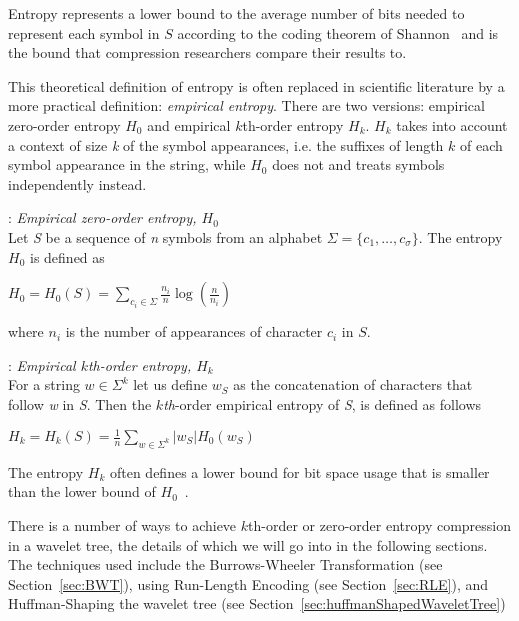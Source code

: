Entropy represents a lower bound to the average number of bits needed to represent each symbol in $S$ according to the coding theorem of Shannon~ and is the bound that compression researchers compare their results to.

This theoretical definition of entropy is often replaced in scientific literature by a more practical definition: \textit{empirical entropy}.
There are two versions: empirical zero-order entropy $H_0$ and empirical $k$th-order entropy $H_k$. $H_k$ takes into account a context of size \textit{k} of the symbol appearances, i.e. the suffixes of length $k$ of each symbol appearance in the string, while $H_0$ does not and treats symbols independently instead. 

\begin{mdframed}[nobreak, linecolor=lightgray, linewidth=2pt]
\begin{definition}: \emph{Empirical zero-order entropy, $H_0$} \\
Let \textit{S} be a sequence of \textit{n} symbols from an alphabet $\Sigma = \lbrace c_1, \ldots, c_\sigma \rbrace$.
The entropy $H_0$ is defined as
\begin{center}
$H_0 = H_0(S) = \sum\limits_{c_i \in \Sigma} \frac{n_i}{n} \log(\frac{n}{n_i})$
\end{center}
where $n_i$ is the number of appearances of character $c_i$ in $S$.
\end{definition}
\begin{definition}: \emph{Empirical $k$\emph{th}-order entropy, $H_k$} \\
For a string $w \in \Sigma^k$ let us define $w_S$ as the concatenation of characters that follow \textit{w} in \textit{S}. 
Then the $k$\emph{th}-order empirical entropy of \textit{S}, is defined as follows
\begin{center}
$H_k = H_k(S) = \frac{1}{n} \sum\limits_{w \in \Sigma^k} | w_S |H_0(w_S)$
\end{center}
\end{definition}
\end{mdframed}
The entropy $H_k$ often defines a lower bound for bit space usage that is smaller than the lower bound of $H_0$~.

There is a number of ways to achieve $k$th-order or zero-order entropy compression in a wavelet tree, the details of which we will go into in the following sections.
The techniques used include the Burrows-Wheeler Transformation (see Section~\ref{sec:BWT}), using Run-Length Encoding (see Section~\ref{sec:RLE}), and Huffman-Shaping the wavelet tree (see Section~\ref{sec:huffmanShapedWaveletTree})

